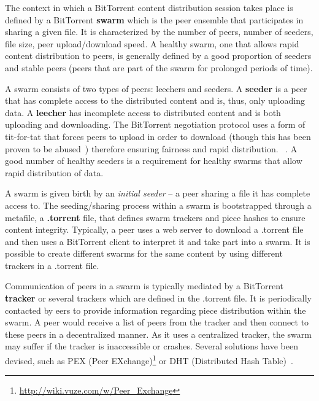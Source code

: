 The context in which a BitTorrent content distribution session takes place is
defined by a BitTorrent \textbf{swarm} which is the peer ensemble that
participates in sharing a given file. It is characterized by the number of
peers, number of seeders, file size, peer upload/download speed. A healthy
swarm, one that allows rapid content distribution to peers, is generally
defined by a good proportion of seeders and stable peers (peers that are part
of the swarm for prolonged periods of time).

A swarm consists of two types of peers: leechers and seeders. A
\textbf{seeder} is a peer that has complete access to the distributed content
and is, thus, only uploading data. A \textbf{leecher} has incomplete access to
distributed content and is both uploading and downloading. The BitTorrent
negotiation protocol uses a form of tit-for-tat that forces peers to upload in
order to download (though this has been proven to be
abused~\cite{free-riding}) therefore ensuring fairness and rapid distribution.
~\cite{bt-pef}.
A good number of healthy seeders is a requirement for healthy swarms that
allow rapid distribution of data.

A swarm is given birth by an \textit{initial seeder} -- a peer sharing
a file it has complete access to. The seeding/sharing process within a swarm
is bootstrapped through a metafile, a \textbf{.torrent} file, that defines swarm
trackers and piece hashes to ensure content integrity. Typically, a peer uses
a web server to download a .torrent file and then uses a BitTorrent client to
interpret it and take part into a swarm. It is possible to create different
swarms for the same content by using different trackers in a .torrent file.

Communication of peers in a swarm is typically mediated by a BitTorrent
\textbf{tracker} or several trackers which are defined in the .torrent file.
It is periodically contacted by eers to provide information regarding
piece distribution within the swarm. A peer would receive a list of peers from
the tracker and then connect to these peers in a decentralized manner. As it
uses a centralized tracker, the swarm may suffer if the tracker is
inaccessible or crashes. Several solutions have been devised, such as PEX
(Peer EXchange)\footnote{\url{http://wiki.vuze.com/w/Peer\_Exchange}} or DHT (Distributed Hash Table)~\cite{dht-paper}.

